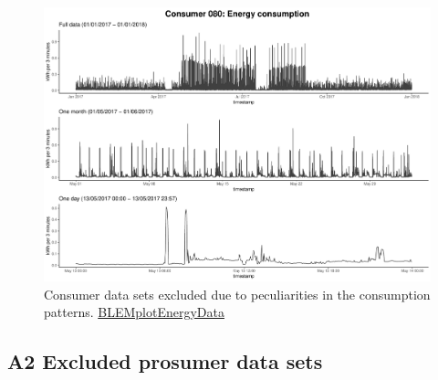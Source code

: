 \begin{centering}
\begin{figure}[!htbp]
        \includegraphics[width=\textwidth-0.85cm]{thesis/graphs/timeseries/c080_cons.pdf}
        \caption[Consumer data sets excluded due to peculiarities in the consumption patterns]{Consumer data sets excluded due to peculiarities in the consumption patterns. \quantnet\href{https://github.com/QuantLet/BLEM/tree/master/BLEMplotEnergyData}{BLEMplotEnergyData}}
\end{figure}
\end{centering}


\subsection*{\hypertarget{AppA2:Figures:Excludedp}{A2} Excluded prosumer data sets}\label{AppA2:Figures:Excludedp}

